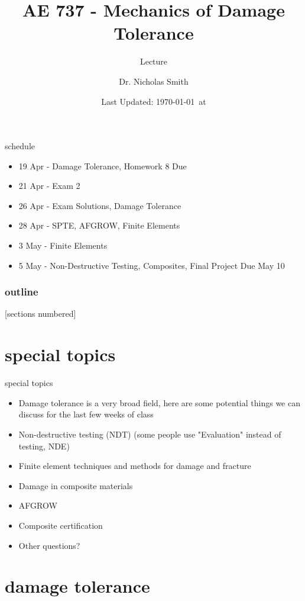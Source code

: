 \documentclass[10pt]{beamer}
\title{AE 737 - Mechanics of Damage Tolerance}
\subtitle{Lecture \arabic{lecture}}
\date{Last Updated: \today\ at \DTMcurrenttime}
\author{Dr. Nicholas Smith}
\institute{Wichita State University, Department of Aerospace Engineering}
\begin{document}
	
	\maketitle
	\begin{frame}{schedule}
		\begin{itemize}
			\item 19 Apr - Damage Tolerance, Homework 8 Due
			\item 21 Apr - Exam 2
			\item 26 Apr - Exam Solutions, Damage Tolerance
			\item 28 Apr - SPTE, AFGROW, Finite Elements
			\item 3 May - Finite Elements
			\item 5 May - Non-Destructive Testing, Composites, Final Project Due May 10
		\end{itemize}
	\end{frame}
	
	\begin{frame}
		\frametitle{outline}
		[sections numbered]
		\tableofcontents[hideallsubsections]
	\end{frame}

	\section{special topics}
	
	\begin{frame}{special topics}
		\begin{itemize}[<+->]
			\item Damage tolerance is a very broad field, here are some potential things we can discuss for the last few weeks of class
			\item Non-destructive testing (NDT) (some people use "Evaluation" instead of testing, NDE)
			\item Finite element techniques and methods for damage and fracture
			\item Damage in composite materials
			\item AFGROW
			\item Composite certification 
			\item Other questions?
		\end{itemize}
	\end{frame}
	
	\section{damage tolerance}
	
\end{document}
